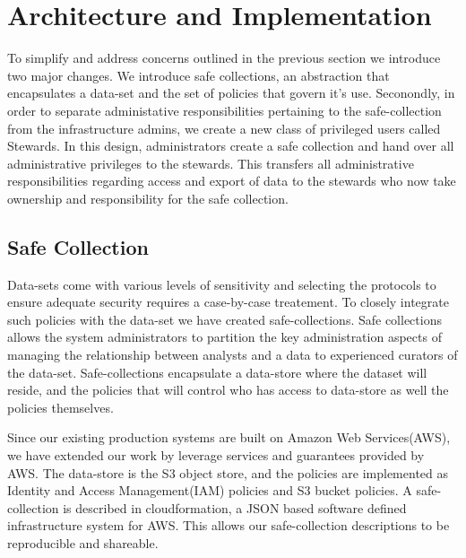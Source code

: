 \section{Architecture and Implementation}
\label{sec:architecture}


To simplify and address concerns outlined in the previous section we introduce two
major changes. We introduce safe collections, an abstraction that encapsulates
a data-set and the set of policies that govern it's use. Seconondly, in order to separate
administative responsibilities pertaining to the safe-collection from the infrastructure
admins, we create a new class of privileged users called Stewards. In this design, administrators
create a safe collection and hand over all administrative privileges to the stewards. This transfers
all administrative responsibilities regarding access and export of data to the stewards who now take
ownership and responsibility for the safe collection.

\subsection{Safe Collection}

Data-sets come with various levels of sensitivity and selecting the protocols to ensure adequate security
requires a case-by-case treatement. To closely integrate such policies with the data-set we have created
safe-collections. Safe collections allows the system administrators to partition the key administration
aspects of managing the relationship between analysts and a data to experienced curators of the data-set.
Safe-collections encapsulate a data-store where the dataset will reside, and the policies that will control
who has access to data-store as well the policies themselves.

Since our existing production systems are built on Amazon Web Services(AWS), we have extended our work by
leverage services and guarantees provided by AWS.
The data-store is the S3 object store, and the policies are implemented as Identity and Access
Management(IAM) policies and S3 bucket policies.
A safe-collection is described in cloudformation, a JSON based software defined infrastructure system for AWS.
This allows our safe-collection descriptions to be reproducible and shareable.

